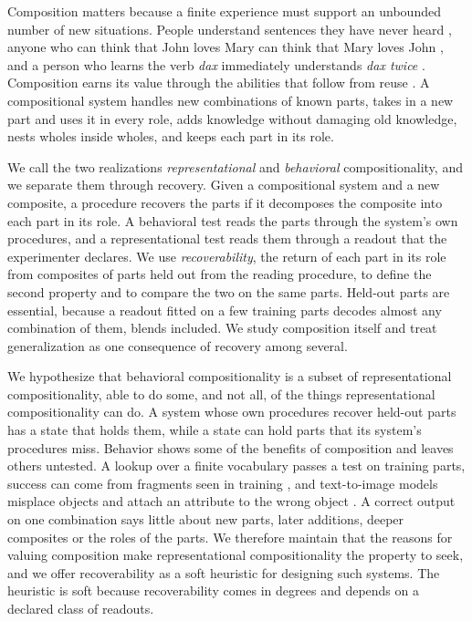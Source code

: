\documentclass[10pt]{article}
\theoremstyle{plain}
\theoremstyle{remark}
\begin{document}
Composition matters because a finite experience must support an unbounded number of new situations. People understand sentences they have never heard \citep{chomsky1957}, anyone who can think that John loves Mary can think that Mary loves John \citep{fodor1988}, and a person who learns the verb \emph{dax} immediately understands \emph{dax twice} \citep{lake2018}. Composition earns its value through the abilities that follow from reuse \citep{lake2017}. A compositional system handles new combinations of known parts, takes in a new part and uses it in every role, adds knowledge without damaging old knowledge, nests wholes inside wholes, and keeps each part in its role.

We call the two realizations \emph{representational} and \emph{behavioral} compositionality, and we separate them through recovery. Given a compositional system and a new composite, a procedure recovers the parts if it decomposes the composite into each part in its role. A behavioral test reads the parts through the system's own procedures, and a representational test reads them through a readout that the experimenter declares. We use \emph{recoverability}, the return of each part in its role from composites of parts held out from the reading procedure, to define the second property and to compare the two on the same parts. Held-out parts are essential, because a readout fitted on a few training parts decodes almost any combination of them, blends included. We study composition itself and treat generalization as one consequence of recovery among several.

We hypothesize that behavioral compositionality is a subset of representational compositionality, able to do some, and not all, of the things representational compositionality can do. A system whose own procedures recover held-out parts has a state that holds them, while a state can hold parts that its system's procedures miss. Behavior shows some of the benefits of composition and leaves others untested. A lookup over a finite vocabulary passes a test on training parts, success can come from fragments seen in training \citep{dziri2023}, and text-to-image models misplace objects \citep{conwell2022} and attach an attribute to the wrong object \citep{rassin2022}. A correct output on one combination says little about new parts, later additions, deeper composites or the roles of the parts. We therefore maintain that the reasons for valuing composition make representational compositionality the property to seek, and we offer recoverability as a soft heuristic for designing such systems. The heuristic is soft because recoverability comes in degrees and depends on a declared class of readouts.
\end{document}
